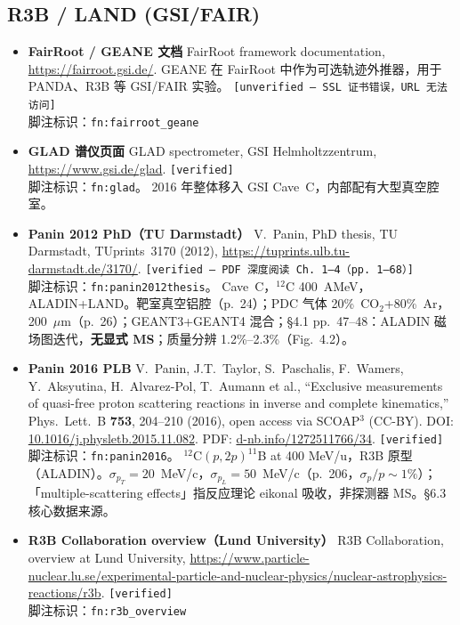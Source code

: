 \documentclass[a4paper, 11pt]{article}
\begin{document}
\subsection{R3B / LAND (GSI/FAIR)}

\begin{itemize}[leftmargin=2em,itemsep=3pt]

\item \textbf{FairRoot / GEANE 文档} \quad
FairRoot framework documentation, \url{https://fairroot.gsi.de/}.
GEANE 在 FairRoot 中作为可选轨迹外推器，用于 PANDA、R3B 等 GSI/FAIR 实验。
\texttt{[unverified --- SSL 证书错误，URL 无法访问]}
\\
脚注标识：\texttt{fn:fairroot\_geane}

\item \textbf{GLAD 谱仪页面} \quad
GLAD spectrometer, GSI Helmholtzzentrum,
\url{https://www.gsi.de/glad}.
\texttt{[verified]}
\\
脚注标识：\texttt{fn:glad}。
2016 年整体移入 GSI Cave~C，内部配有大型真空腔室。

\item \textbf{Panin 2012 PhD（TU Darmstadt）} \quad
V.~Panin, PhD thesis, TU Darmstadt, TUprints~3170 (2012),
\url{https://tuprints.ulb.tu-darmstadt.de/3170/}.
\texttt{[verified --- PDF 深度阅读 Ch.~1--4（pp.~1--68）]}
\\
脚注标识：\texttt{fn:panin2012thesis}。
Cave~C，$^{12}$C 400~AMeV，ALADIN+LAND。靶室真空铝腔（p.~24）；PDC 气体 20\%~CO$_2$+80\%~Ar，200~$\mu$m（p.~26）；GEANT3+GEANT4 混合；§4.1 pp.~47--48：ALADIN 磁场图迭代，\textbf{无显式 MS}；质量分辨 1.2\%--2.3\%（Fig.~4.2）。

\item \textbf{Panin 2016 PLB} \quad
V.~Panin, J.T.~Taylor, S.~Paschalis, F.~Wamers, Y.~Aksyutina, H.~Alvarez-Pol, T.~Aumann et al., ``Exclusive measurements of quasi-free proton scattering reactions in inverse and complete kinematics,''
Phys.\ Lett.\ B \textbf{753}, 204--210 (2016), open access via SCOAP$^3$ (CC-BY).
DOI: \href{https://doi.org/10.1016/j.physletb.2015.11.082}{10.1016/j.physletb.2015.11.082}.
PDF: \href{https://d-nb.info/1272511766/34}{d-nb.info/1272511766/34}.
\texttt{[verified]}
\\
脚注标识：\texttt{fn:panin2016}。
$^{12}$C$(p,2p)^{11}$B at 400 MeV/u，R3B 原型（ALADIN）。$\sigma_{p_T}=20$~MeV/c，$\sigma_{p_L}=50$~MeV/c（p.~206，$\sigma_p/p \sim 1\%$）；「multiple-scattering effects」指反应理论 eikonal 吸收，非探测器 MS。§6.3 核心数据来源。

\item \textbf{R3B Collaboration overview（Lund University）} \quad
R3B Collaboration, overview at Lund University,
\url{https://www.particle-nuclear.lu.se/experimental-particle-and-nuclear-physics/nuclear-astrophysics-reactions/r3b}.
\texttt{[verified]}
\\
脚注标识：\texttt{fn:r3b\_overview}


\end{itemize}
\end{document}
